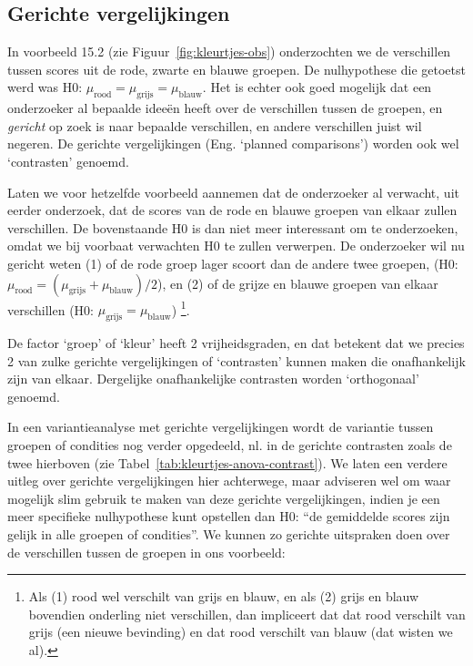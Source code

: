 \documentclass[
]{book}
\begin{document}
\hypertarget{sec:anova-oneway-gericht}{%
\subsection{Gerichte vergelijkingen}\label{sec:anova-oneway-gericht}}

In voorbeeld 15.2 (zie
Figuur~\ref{fig:kleurtjes-obs}) onderzochten we de verschillen tussen
scores uit de rode, zwarte en blauwe groepen. De nulhypothese die
getoetst werd was H0:
\(\mu_\textrm{rood} = \mu_\textrm{grijs} = \mu_\textrm{blauw}\).
Het is
echter ook goed mogelijk dat een onderzoeker al bepaalde ideeën heeft
over de verschillen tussen de groepen, en \emph{gericht} op zoek is naar
bepaalde verschillen, en andere verschillen juist wil negeren. De
gerichte vergelijkingen (Eng. `planned comparisons') worden ook wel
`contrasten' genoemd.

Laten we voor hetzelfde voorbeeld aannemen dat de onderzoeker al
verwacht, uit eerder onderzoek, dat de scores van de rode en blauwe
groepen van elkaar zullen verschillen. De bovenstaande H0 is dan niet
meer interessant om te onderzoeken, omdat we bij voorbaat verwachten H0
te zullen verwerpen. De onderzoeker wil nu gericht weten
(1) of de rode
groep lager scoort dan de andere twee groepen, (H0:
\(\mu_\textrm{rood} = (\mu_\textrm{grijs}+\mu_\textrm{blauw})/2\)), en
(2)
of de grijze en blauwe groepen van elkaar verschillen (H0:
\(\mu_\textrm{grijs} = \mu_\textrm{blauw}\))
\footnote{Als (1) rood wel verschilt van grijs en blauw, en als (2) grijs en blauw bovendien onderling niet verschillen, dan impliceert dat dat rood verschilt van grijs (een nieuwe bevinding) en dat rood verschilt van blauw (dat wisten we al).}.

De factor `groep' of `kleur' heeft 2 vrijheidsgraden, en dat betekent dat we
precies 2 van zulke gerichte vergelijkingen of `contrasten' kunnen maken
die onafhankelijk zijn van elkaar. Dergelijke onafhankelijke contrasten
worden `orthogonaal' genoemd.

In een variantieanalyse met gerichte vergelijkingen wordt de variantie
tussen groepen of condities nog verder opgedeeld, nl. in de gerichte
contrasten zoals de twee hierboven (zie
Tabel~\ref{tab:kleurtjes-anova-contrast}). We laten een verdere uitleg
over gerichte vergelijkingen hier achterwege, maar adviseren wel om waar
mogelijk slim gebruik te maken van deze gerichte vergelijkingen, indien
je een meer specifieke nulhypothese kunt opstellen dan H0: ``de
gemiddelde scores zijn gelijk in alle groepen of condities''. We kunnen
zo gerichte uitspraken doen over de verschillen tussen de groepen in ons
voorbeeld:
\end{document}
